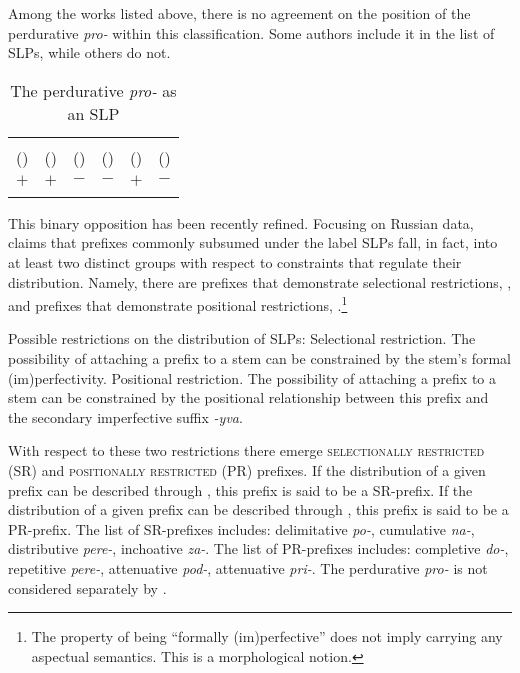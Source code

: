 \documentclass[output=paper,
]{langscibook}
\begin{document}
\noindent Among the works listed above, there is no agreement on the position of the perdurative \textit{pro-} within this classification. Some authors include it in the list of SLPs, while others do not.


\begin{table}[h!]
\caption{The perdurative \textit{pro-} as an SLP}
\small
\label{tab1}
\begin{tabularx}{\textwidth}{cCCCCC}
  \lsptoprule
            \citeauthor{babko1999zero}  &	\citeauthor{ramchand2005time} &	\citeauthor{svenonius2004slavic}  &	\citeauthor{romanova2007constructing}  &	\citeauthor{gehrke2008ps}  &	\citeauthor{tolskaya2015verbal}\\ 
            (\citeyear{babko1999zero}) & (\citeyear{ramchand2005time}) & (\citeyear{svenonius2004slavic}) & (\citeyear{romanova2007constructing}) & (\citeyear{gehrke2008ps}) & (\citeyear{tolskaya2015verbal}) \\
  \midrule
 $+$ &    $+$  &    $-$ & $-$ & $+$ & $-$\\
  \lspbottomrule
 \end{tabularx}
\end{table}  

This binary opposition has been recently refined. Focusing on Russian data, \citet{tatevosov2009mnozestvennaja,tatevosov2013mnozestvennaja} claims that prefixes commonly subsumed under the label SLPs fall, in fact, into at least two distinct groups with respect to constraints that regulate their distribution. Namely, there are prefixes that demonstrate selectional restrictions, , and prefixes that demonstrate positional restrictions, .\footnote{ The property of being ``formally (im)perfective'' does not imply carrying any aspectual semantics. This is a morphological notion.}


\ea \label{ex:naumov:6} Possible restrictions on the distribution of SLPs:
\ea \label{ex:naumov:6a} Selectional restriction. The possibility of attaching a prefix to a stem can be constrained by the stem's formal (im)perfectivity.
\ex \label{ex:naumov:6b} Positional restriction. The possibility of attaching a prefix to a stem can be constrained by the positional relationship between this prefix and the secondary imperfective suffix \textit{-yva}.
\z \z

\noindent With respect to these two restrictions there emerge \textsc{selectionally restricted} (SR) and \textsc{positionally restricted} (PR) prefixes. If the distribution of a given prefix can be described through , this prefix is said to be a SR-prefix. If the distribution of a given prefix can be described through , this prefix is said to be a PR-prefix. The list of SR-prefixes includes: delimitative \textit{po-}, cumulative \mbox{\textit{na-},} distributive \textit{pere-}, inchoative \textit{za-}. The list of PR-prefixes includes: completive \mbox{\textit{do-},} repetitive \textit{pere-}, attenuative \textit{pod-}, attenuative \textit{pri-}. The perdurative \textit{pro-} is not considered separately by \citet{tatevosov2009mnozestvennaja, tatevosov2013mnozestvennaja}.
\end{document}
